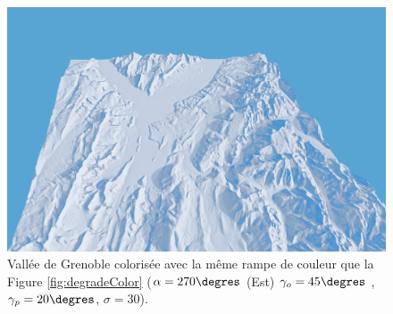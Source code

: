 \begin{figure}[h!]

   \centering
   \includegraphics[width=1.0\linewidth]{Resultats/7_grenoble.png}
   \caption{Vallée de Grenoble colorisée avec la même rampe de couleur que la Figure \ref{fig:degradeColor} ($\alpha = 270\degres$ (Est) $\gamma_o = 45\degres$ , $\gamma_p = 20\degres$, $\sigma = 30$).}
\end{figure}






